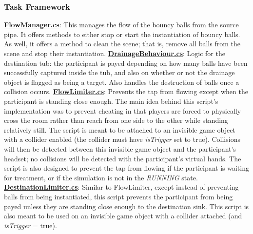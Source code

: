\documentclass{article}
\begin{document}
\subsubsection*{Task Framework}
\href{https://bit.ly/2WrbyxT}{\textbf{FlowManager.cs}}: This manages the flow of the bouncy balls from the source pipe. It offers methods to either stop or start the instantiation of bouncy balls. As well, it offers a method to clean the scene; that is, remove all balls from the scene and stop their instantiation. \newline \newline 
\href{https://bit.ly/2YtMEjd}{\textbf{DrainageBehaviour.cs}}: Logic for the destination tub: the participant is payed depending on how many balls have been successfully captured inside the tub, and also on whether or not the drainage object is flagged as being a target. Also handles the destruction of balls once a collision occurs. \newline \newline 
\href{https://bit.ly/2TUX1h4}{\textbf{FlowLimiter.cs}}: Prevents the tap from flowing except when the participant is standing close enough. The main idea behind this script's implementation was to prevent cheating in that players are forced to physically cross the room rather than reach from one side to the other while standing relatively still. The script is meant to be attached to an invisible game object with a collider enabled (the collider must have \textit{isTrigger} set to true). Collisions will then be detected between this invisible game object and the participant's headset; no collisions will be detected with the participant's virtual hands. The script is also designed to prevent the tap from flowing if the participant is waiting for treatment, or if the simulation is not in the \textit{RUNNING} state. \newline \newline
\href{https://bit.ly/2JGhr8M}{\textbf{DestinationLimiter.cs}}: Similar to FlowLimiter, except instead of preventing balls from being instantiated, this script prevents the participant from being payed unless they are standing close enough to the destination sink. This script is also meant to be used on an invisible game object with a collider attached (and \textit{isTrigger} = true). 
\end{document}
